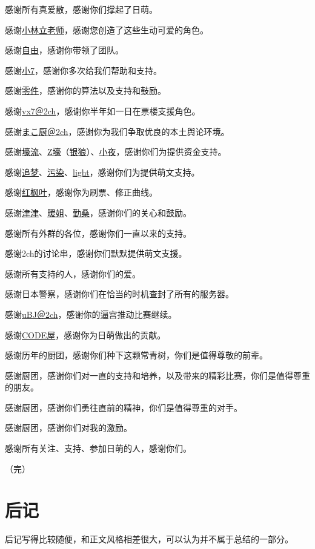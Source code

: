 感谢所有真爱散，感谢你们撑起了日萌。

感谢\uline{小林立老师}，感谢您创造了这些生动可爱的角色。

感谢\uline{自由}，感谢你带领了团队。

感谢\uline{小7}，感谢你多次给我们帮助和支持。

感谢\uline{零件}，感谢你的算法以及支持和鼓励。

感谢\uline{vx7＠2ch}，感谢你半年如一日在票楼支援角色。

感谢\uline{まこ厨＠2ch}，感谢你为我们争取优良的本土舆论环境。

感谢\uline{壕流}、\uline{Z壕}（\uline{银狼}）、\uline{小夜}，感谢你们为提供资金支持。

感谢\uline{追梦}、\uline{污染}、\uline{light}，感谢你们为提供萌文支持。

感谢\uline{红枫叶}，感谢你为刷票、修正曲线。

感谢\uline{津津}、\uline{暖姐}、\uline{勤桑}，感谢你们的关心和鼓励。

感谢所有外群的各位，感谢你们一直以来的支持。

感谢2ch的讨论串，感谢你们默默提供萌文支援。

感谢所有支持的人，感谢你们的爱。

感谢日本警察，感谢你们在恰当的时机查封了所有的服务器。

感谢\uline{uBJ＠2ch}，感谢你的逼宫推动比赛继续。

感谢\uline{CODE屋}，感谢你为日萌做出的贡献。

感谢历年的厨团，感谢你们种下这颗常青树，你们是值得尊敬的前辈。

感谢厨团，感谢你们对一直的支持和培养，以及带来的精彩比赛，你们是值得尊重的朋友。

感谢厨团，感谢你们勇往直前的精神，你们是值得尊重的对手。

感谢厨团，感谢你们对我的激励。

感谢所有关注、支持、参加日萌的人，感谢你们。

（完）

\chapter*{后记}

后记写得比较随便，和正文风格相差很大，可以认为并不属于总结的一部分。

